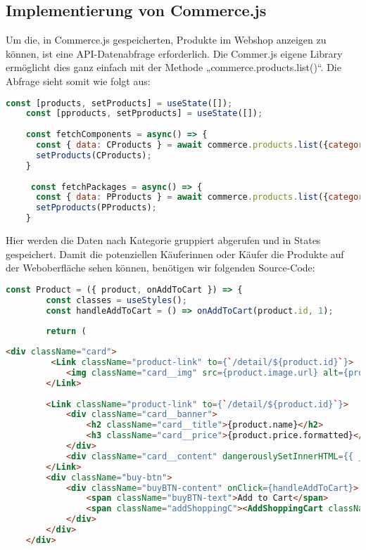 \subsection{Implementierung von Commerce.js}

Um die, in Commerce.js gespeicherten, Produkte im Webshop anzeigen zu können, ist eine API-Datenabfrage erforderlich. Die Commer.js eigene Library ermöglicht dies ganz einfach mit der Methode „commerce.products.list()“. Die Abfrage sieht somit wie folgt aus:

\begin{lstlisting}[language=JavaScript]
    const [products, setProducts] = useState([]);
    const [pproducts, setPproducts] = useState([]);
    
    const fetchComponents = async() => {
      const { data: CProducts } = await commerce.products.list({category_slug: ['components'],});
      setProducts(CProducts);
    }
  
     const fetchPackages = async() => {
      const { data: PProducts } = await commerce.products.list({category_slug: ['packages'],});
      setPproducts(PProducts);
    }
\end{lstlisting}

Hier werden die Daten nach Kategorie gruppiert abgerufen und in States gespeichert. Damit die potenziellen Käuferinnen oder Käufer die Produkte auf der Weboberfläche sehen können, benötigen wir folgenden Source-Code:

\begin{lstlisting}[language=JavaScript]
    const Product = ({ product, onAddToCart }) => {
        const classes = useStyles();
        const handleAddToCart = () => onAddToCart(product.id, 1);
      
        return (
\end{lstlisting}


\begin{lstlisting}[language=HTML]
    <div className="card">
         <Link className="product-link" to={`/detail/${product.id}`}>
            <img className="card__img" src={product.image.url} alt={product.name} />
        </Link>
      
        <Link className="product-link" to={`/detail/${product.id}`}>
            <div className="card__banner">
                <h2 className="card__title">{product.name}</h2>
                <h3 className="card__price">{product.price.formatted}</h3>
            </div>
            <div className="card__content" dangerouslySetInnerHTML={{ __html: product.description }} />
        </Link>
        <div className="buy-btn">
            <div className="buyBTN-content" onClick={handleAddToCart}>
                <span className="buyBTN-text">Add to Cart</span>
                <span className="addShoppingC"><AddShoppingCart className={classes.ascIcon} /></span>
            </div>
        </div>
    </div>
\end{lstlisting}

